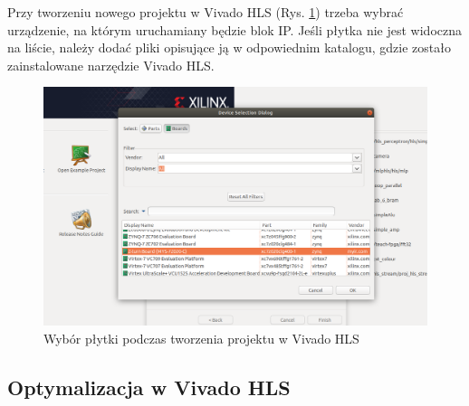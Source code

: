 Przy tworzeniu nowego projektu w Vivado HLS (Rys. \ref{hls_new_project}) trzeba wybrać 
urządzenie, na którym uruchamiany będzie blok IP. Jeśli płytka nie jest widoczna na 
liście, należy dodać pliki opisujące ją w odpowiednim katalogu, gdzie zostało 
zainstalowane narzędzie Vivado HLS.  

\begin{figure}[!h]
  \centering
  \includegraphics[width=\textwidth]{img/vivado-hls-new.png}
  \caption{Wybór płytki podczas tworzenia projektu w Vivado HLS}
  \label{hls_new_project}
\end{figure}

\subsection{Optymalizacja w Vivado HLS}

